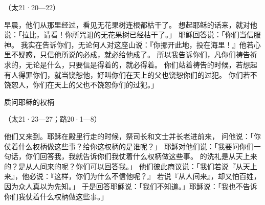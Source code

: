 {\par }{\R （太21·20—22）
\par }{\PP {}早晨，他们从那里经过，看见无花果树连根都枯干了。
想起耶稣的话来，就对他说：「拉比，请看！你所咒诅的无花果树已经枯干了。」
耶稣回答说：「你们当信服　神。
我实在告诉你们，无论何人对这座山说：『你挪开此地，投在海里！』他若心里不疑惑，只信他所说的必成，就必给他成了。
所以我告诉你们，凡你们祷告祈求的，无论是什么，只要信是得着的，就必得着。
你们站着祷告的时候，若想起有人得罪你们，就当饶恕他，好叫你们在天上的父也饶恕你们的过犯。
你们若不饶恕人，你们在天上的父也不饶恕你们的过犯。」
\par }{\SH 质问耶稣的权柄
\par }{\R （太21·23—27；路20·1—8）
\par }{\PP {}他们又来到{}。耶稣在殿里行走的时候，祭司长和文士并长老进前来，
问他说：「你仗着什么权柄做这些事？给你这权柄的是谁呢？」
耶稣对他们说：「我要问你们一句话，你们回答我，我就告诉你们我仗着什么权柄做这些事。
的洗礼是从天上来的？是从人间来的呢？你们可以回答我。」
他们彼此商议说：「我们若说『从天上来』，他必说：『这样，你们为什么不信他呢？』
若说『从人间来』，却又怕百姓，因为众人真以{}为先知。」
于是回答耶稣说：「我们不知道。」耶稣说：「我也不告诉你们我仗着什么权柄做这些事。」

}
